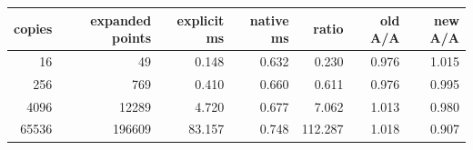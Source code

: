 \begin{center}
\begin{tabular}{rrrrrrr}
\toprule
copies & expanded points & explicit ms & native ms & ratio & old A/A & new A/A\\
\midrule
16 & 49 & 0.148 & 0.632 & 0.230 & 0.976 & 1.015\\
256 & 769 & 0.410 & 0.660 & 0.611 & 0.976 & 0.995\\
4096 & 12289 & 4.720 & 0.677 & 7.062 & 1.013 & 0.980\\
65536 & 196609 & 83.157 & 0.748 & 112.287 & 1.018 & 0.907\\
\bottomrule
\end{tabular}
\end{center}
